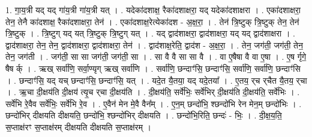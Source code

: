 \documentclass[17pt]{extarticle}
\begin{document}
1. गा॒य॒त्री यद् यद् गा॑य॒त्री गा॑य॒त्री यत् । . यदेका॑दशाक्ष॒ रैका॑दशाक्षरा॒ यद् यदेका॑दशाक्षरा । . एका॑दशाक्षरा॒ तेन॒ तेनै का॑दशाक्ष॒ रैका॑दशाक्षरा॒ तेन॑ । . एका॑दशाक्ष॒रेत्येका॑दश - अ॒क्ष॒रा॒ । . तेन॑ त्रि॒ष्टुक् त्रि॒ष्टुक् तेन॒ तेन॑ त्रि॒ष्टुक् । . त्रि॒ष्टुग् यद् यत् त्रि॒ष्टुक् त्रि॒ष्टुग् यत् । . यद् द्वाद॑शाक्षरा॒ द्वाद॑शाक्षरा॒ यद् यद् द्वाद॑शाक्षरा । . द्वाद॑शाक्षरा॒ तेन॒ तेन॒ द्वाद॑शाक्षरा॒ द्वाद॑शाक्षरा॒ तेन॑ । . द्वाद॑शाक्ष॒रेति॒ द्वाद॑श - अ॒क्ष॒रा॒ । . तेन॒ जग॑ती॒ जग॑ती॒ तेन॒ तेन॒ जग॑ती । . जग॑ती॒ सा सा जग॑ती॒ जग॑ती॒ सा । . सा वै वै सा सा वै । . वा ए॒षैषा वै वा ए॒षा । . ए॒ष र्गृगे॒ षैष र्क् । . ऋख् सर्वा॑णि॒ सर्वा॒ण्यृग् ऋख् सर्वा॑णि । . सर्वा॑णि॒ छन्दाꣳ॑सि॒ छन्दाꣳ॑सि॒ सर्वा॑णि॒ सर्वा॑णि॒ छन्दाꣳ॑सि । . छन्दाꣳ॑सि॒ यद् यच् छन्दाꣳ॑सि॒ छन्दाꣳ॑सि॒ यत् । . यदे॒त यै॒तया॒ यद् यदे॒तया᳚ । . ए॒तय॒ र्‌च र्‌चैत यै॒तय॒ र्‌चा । . ऋ॒चा दी॒क्षय॑ति दी॒क्षय॑ त्यृ॒च र्‌चा दी॒क्षय॑ति । . दी॒क्षय॑ति॒ सर्वे॑भिः॒ सर्वे॑भिर् दी॒क्षय॑ति दी॒क्षय॑ति॒ सर्वे॑भिः । . सर्वे॑भि रे॒वैव सर्वे॑भिः॒ सर्वे॑भि रे॒व । . ए॒वैन॑ मेन मे॒वै वैन᳚म् । . ए॒न॒म् छन्दो॑भि॒ श्छन्दो॑भि रेन मेन॒म् छन्दो॑भिः । . छन्दो॑भिर् दीक्षयति दीक्षयति॒ छन्दो॑भि॒ श्छन्दो॑भिर् दीक्षयति । . छन्दो॑भि॒रिति॒ छन्दः॑ - भिः॒ । . दी॒क्ष॒य॒ति॒ स॒प्ताक्ष॑रꣳ स॒प्ताक्ष॑रम् दीक्षयति दीक्षयति स॒प्ताक्ष॑रम् । \newline
\end{document}

